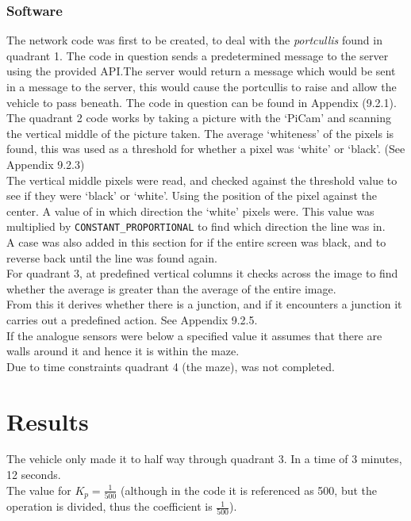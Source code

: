 \documentclass[paper=a4, fontsize=11pt]{scrartcl} %
\numberwithin{equation}{section} %
\numberwithin{figure}{section} %
\begin{document}
\subsubsection{Software}
The network code was first to be created, to deal with the \textit{portcullis}
found in quadrant 1. The code in question sends a predetermined message to the
server using the provided API.\@ The server would return a message which would be
sent in a message to the server, this would cause the portcullis to raise and
allow the vehicle to pass beneath. The code in question can be found in Appendix
(9.2.1).\\

The quadrant 2 code works by taking a picture with the `PiCam' and scanning the
vertical middle of the picture taken. The average `whiteness' of the pixels is
found, this was used as a threshold for whether a pixel was `white' or
`black'. (See Appendix 9.2.3)\\

The vertical middle pixels were read, and checked against the threshold value to
see if they were `black' or `white'. Using the position of the pixel against the
center. A value of in which direction the `white' pixels were. This value was
multiplied by \verb|CONSTANT_PROPORTIONAL| to find which direction the line was
in.\\

A case was also added in this section for if the entire screen was black, and to
reverse back until the line was found again.\\

For quadrant 3, at predefined vertical columns it checks across the image to
find whether the average is greater than the average of the entire image.\\
From this it derives whether there is a junction, and if it encounters a
junction it carries out a predefined action. See Appendix 9.2.5.\\

If the analogue sensors were below a specified value it assumes that there are
walls around it and hence it is within the maze.\\

Due to time constraints quadrant 4 (the maze), was not completed.\\

\section{Results}
The vehicle only made it to half way through quadrant 3. In a time of 3 minutes,
12 seconds.\\
The value for $K_p=\frac{1}{500}$ (although in the code it is referenced as 500,
but the operation is divided, thus the coefficient is $\frac{1}{500}$).\\
\end{document}
